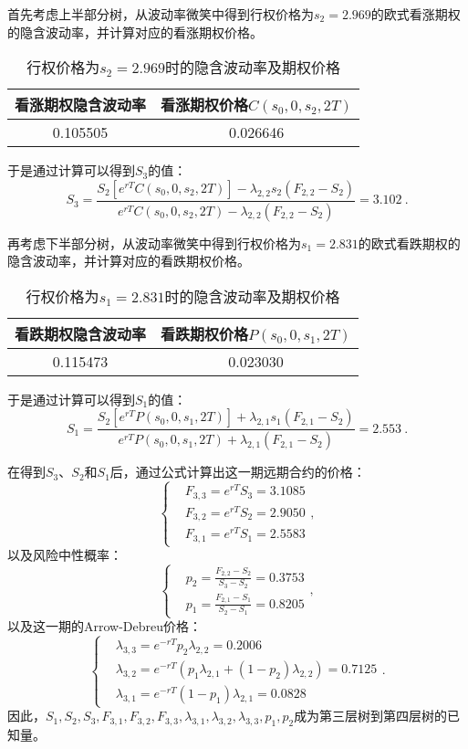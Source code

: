 首先考虑上半部分树，从波动率微笑中得到行权价格为$s_2 = 2.969$的欧式看涨期权的隐含波动率，并计算对应的看涨期权价格。
\begin{table}[H]
	\centering
	\caption{行权价格为$s_2 = 2.969$时的隐含波动率及期权价格}
	\begin{tabular}{|c|c|}
		\hline
		看涨期权隐含波动率 & 看涨期权价格$C(s_0,0,s_2,2T)$\\\hline
		0.105505&0.026646\\\hline
	\end{tabular}
\end{table}
于是通过计算可以得到$S_3$的值：
$$S_3 = \frac{S_2\left[e^{rT}C(s_0,0,s_2,2T)\right]-\lambda_{2,2}s_2\left(F_{2,2}-S_2\right)}{e^{rT}C(s_0,0,s_2,2T)-\lambda_{2,2}\left(F_{2,2}-S_2\right)} = 3.102 \ .$$

再考虑下半部分树，从波动率微笑中得到行权价格为$s_1 = 2.831$的欧式看跌期权的隐含波动率，并计算对应的看跌期权价格。
\begin{table}[H]
	\centering
	\caption{行权价格为$s_1 = 2.831$时的隐含波动率及期权价格}
	\begin{tabular}{|c|c|}
		\hline
		看跌期权隐含波动率 & 看跌期权价格$P(s_0,0,s_1,2T)$\\\hline
		0.115473&0.023030\\\hline
	\end{tabular}
\end{table}
于是通过计算可以得到$S_1$的值：
$$S_1 = \frac{S_2\left[e^{rT}P(s_0,0,s_1,2T)\right]+	\lambda_{2,1}s_1\left(F_{2,1}-S_2\right)}{e^{rT}P(s_0,0,s_1,2T)+
	\lambda_{2,1}\left(F_{2,1}-S_2\right)} = 2.553\ .$$

在得到$S_3$、$S_2$和$S_1$后，通过公式计算出这一期远期合约的价格：
\begin{equation*}
	\left\{
	\begin{aligned}
		& F_{3,3} = e^{rT}S_3 = 3.1085 \\
		&F_{3,2} = e^{rT}S_2 = 2.9050 \\
		& F_{3,1} = e^{rT}S_1 = 2.5583
	\end{aligned}
	\right. ,
\end{equation*}
以及风险中性概率：
\begin{equation*}
	\left\{
	\begin{aligned}
		& p_2 = \frac{F_{2,2}-S_2}{S_3-S_2} = 0.3753\\
		& p_1 = \frac{F_{2,1}-S_1}{S_2-S_1} = 0.8205
	\end{aligned}
	\right. ,
\end{equation*}
以及这一期的Arrow-Debreu价格：
\begin{equation*}
	\left\{
	\begin{aligned}
		&\lambda_{3,3} = e^{-rT}p_2\lambda_{2,2} = 0.2006\\
		& \lambda_{3,2} = e^{-rT}(p_1\lambda_{2,1}+(1-p_2)\lambda_{2,2})= 0.7125 \\
		&\lambda_{3,1} = e^{-rT}(1-p_1)\lambda_{2,1} = 0.0828
	\end{aligned}
	\right. .
\end{equation*}
因此，$S_1,S_2,S_3,F_{3,1},F_{3,2},F_{3,3},\lambda_{3,1},\lambda_{3,2},\lambda_{3,3},p_1,p_2$成为第三层树到第四层树的已知量。

